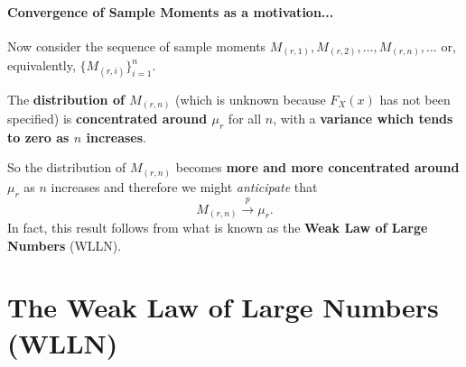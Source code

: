 \documentclass[notes=show,smaller,handout]{beamer}\usepackage[]{graphicx}\usepackage[]{color}
\begin{document}
\begin{frame}{\secname}
\framesubtitle{Convergence of Sample Moments as a motivation...}

Now consider the sequence of sample moments $M_{(r,1)},M_{(r,2)},\dots,M_{(r,n)},\dots$ or, equivalently, $\{M_{(r,i)}\}_{i=1}^{n}$.


The \textbf{distribution of $M_{(r,n)}$} (which is unknown because $F_X(x)$ has not been specified) is \textbf{concentrated around $\mu_r$} for all $n$,
with a \textbf{variance which tends to zero as $n$ increases}. \bigskip

So the distribution of $M_{(r,n)}$ becomes \textbf{more and more concentrated around $\mu_r$} as $n$ increases and therefore we might \color{blue}\emph{anticipate }\color{black} that
  \begin{equation*}
  M_{(r,n)}\overset{p}{\rightarrow }\mu_r.
  \end{equation*}
  In fact, this result follows from what is known as the \textbf{Weak Law of Large Numbers} (WLLN).
\end{frame}%

\section{The Weak Law of Large Numbers (WLLN)}
\end{document}
